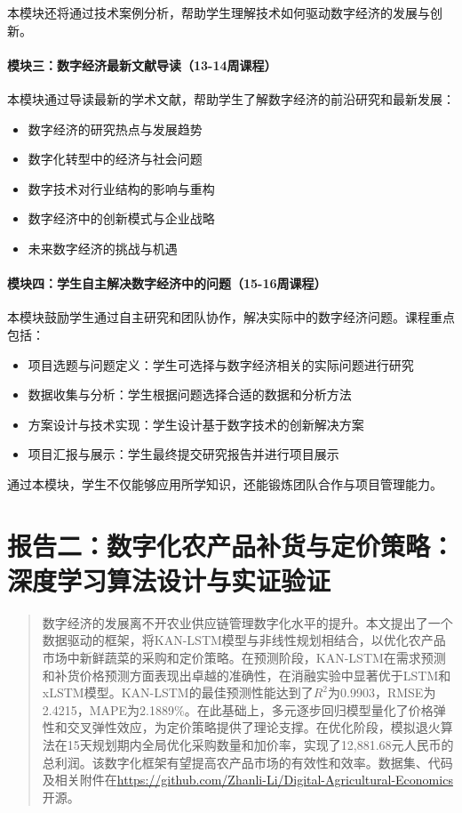 \documentclass[lang=cn,12pt,a4paper]{elegantpaper}
\begin{document}
本模块还将通过技术案例分析，帮助学生理解技术如何驱动数字经济的发展与创新。

\subsection{模块三：数字经济最新文献导读（13-14周课程）}

本模块通过导读最新的学术文献，帮助学生了解数字经济的前沿研究和最新发展：
\begin{itemize}
    \item 数字经济的研究热点与发展趋势
    \item 数字化转型中的经济与社会问题
    \item 数字技术对行业结构的影响与重构
    \item 数字经济中的创新模式与企业战略
    \item 未来数字经济的挑战与机遇
\end{itemize}

\subsection{模块四：学生自主解决数字经济中的问题（15-16周课程）}

本模块鼓励学生通过自主研究和团队协作，解决实际中的数字经济问题。课程重点包括：
\begin{itemize}
    \item 项目选题与问题定义：学生可选择与数字经济相关的实际问题进行研究
    \item 数据收集与分析：学生根据问题选择合适的数据和分析方法
    \item 方案设计与技术实现：学生设计基于数字技术的创新解决方案
    \item 项目汇报与展示：学生最终提交研究报告并进行项目展示
\end{itemize}

通过本模块，学生不仅能够应用所学知识，还能锻炼团队合作与项目管理能力。
\newpage
\part{报告二：数字化农产品补货与定价策略：深度学习算法设计与实证验证}
\begin{abstract}
数字经济的发展离不开农业供应链管理数字化水平的提升。本文提出了一个数据驱动的框架，将KAN-LSTM模型与非线性规划相结合，以优化农产品市场中新鲜蔬菜的采购和定价策略。在预测阶段，KAN-LSTM在需求预测和补货价格预测方面表现出卓越的准确性，在消融实验中显著优于LSTM和xLSTM模型。KAN-LSTM的最佳预测性能达到了$R^2$为0.9903，RMSE为2.4215，MAPE为2.1889\%。在此基础上，多元逐步回归模型量化了价格弹性和交叉弹性效应，为定价策略提供了理论支撑。在优化阶段，模拟退火算法在15天规划期内全局优化采购数量和加价率，实现了12,881.68元人民币的总利润。该数字化框架有望提高农产品市场的有效性和效率。数据集、代码及相关附件在\url{https://github.com/Zhanli-Li/Digital-Agricultural-Economics}开源。
\end{abstract}
\setcounter{section}{0}
\renewcommand{\theHsection}{partB.\arabic{section}} %
\end{document}

